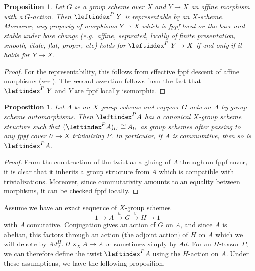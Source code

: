 \documentclass[a4paper,english,12pt]{amsart}
\newtheorem{proposition}[definition]{Proposition}
\numberwithin{equation}{section}
\renewcommand{\_}{\rule{0.25cm}{0.4pt}}
\begin{document}
\begin{proposition}
Let $G$ be a group scheme over $X$ and $Y\to X$ an affine morphism with a $G$-action. Then $\leftindex^{P}{\;Y}$ is representable by an $X$-scheme. Moreover, any property of morphisms $Y \to X$ which is fppf-local on the base and stable under base change (e.g.\ affine, separated, locally of finite presentation, smooth, étale, flat, proper, etc) holds for $\leftindex^{P}{\;Y}\to X$ if and only if it holds for $Y \to X$.
\end{proposition}
\begin{proof}
    For the representability, this follows from effective fppf descent of affine morphisms (see \cite[\href{https://stacks.math.columbia.edu/tag/0245}{Tag 0245}]{stacks-project}). The second assertion follows from the fact that $\leftindex^{P}{\;Y}$ and $Y$ are fppf locally isomorphic.
\end{proof}

\begin{proposition}
Let $A$ be an $X$-group scheme and suppose $G$ acts on $A$ by group scheme automorphisms. Then $\leftindex^{P}{A}$ has a canonical $X$-group scheme structure such that $(\leftindex^{P}{A})_{U}\cong A_{U}$ as group schemes after passing to any fppf cover $U\to X$ trivializing $P$. In particular, if $A$ is commutative, then so is $\leftindex^{P}{A}$.
\end{proposition}
\begin{proof}
From the construction of the twist as a gluing of $A$ through an fppf cover, it is clear that it inherits a group structure from $A$ which is compatible with trivializations. Moreover, since commutativity amounts to an equality between morphisms, it can be checked fppf locally.
\end{proof}

Assume we have an exact sequence of $X$-group schemes
\[
1 \to A \xrightarrow{u} G \xrightarrow{v} H \to 1
\]
with $A$ comutative. Conjugation gives an action of $G$ on $A$, and since $A$ is abelian, this factors through an action (the adjoint action) of $H$ on $A$ which we will denote by $Ad^{H}_{A}\colon H\times_{X} A\to A$ or sometimes simply by $Ad$. For an $H$-torsor $P$, we can therefore define the twist $\leftindex^{P}{A}$ using the $H$-action on $A$. Under these assumptions, we have the following proposition.
\end{document}
